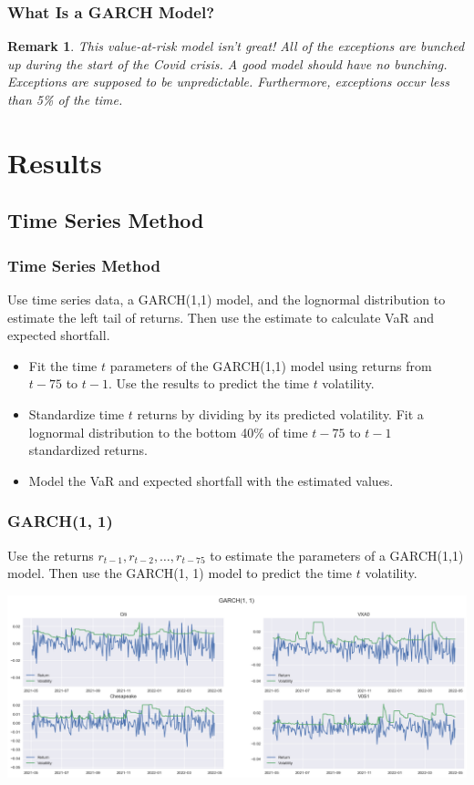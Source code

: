 \documentclass{beamer}
\newtheorem*{remark}{Remark}
\begin{document}
\begin{frame}
\frametitle{What Is a GARCH Model?}
\begin{remark}
This value-at-risk model isn't great! All of the exceptions are bunched up during the start of the Covid crisis. A good model should have no bunching. Exceptions are supposed to be unpredictable. Furthermore, exceptions occur less than 5\% of the time.
\end{remark}

\end{frame}

\section{Results}

\subsection{Time Series Method}

\begin{frame}
\frametitle{Time Series Method}

Use time series data, a GARCH(1,1) model, and the lognormal distribution to estimate the left tail of returns. Then use the estimate to calculate VaR and expected shortfall.
\begin{itemize}
\item Fit the time $t$ parameters of the GARCH(1,1) model using returns from $t-75$ to $t-1$. Use the results to predict the time $t$ volatility.
\item Standardize time $t$ returns by dividing by its predicted volatility. Fit a lognormal distribution to the bottom 40\% of time $t-75$ to $t-1$ standardized returns.
\item Model the VaR and expected shortfall with the estimated values.
\end{itemize}

\end{frame}

\begin{frame}

\frametitle{GARCH(1, 1)}
Use the returns $r_{t-1}, r_{t-2},\ldots, r_{t-75}$ to estimate the parameters of a GARCH(1,1) model. Then use the GARCH(1, 1) model to predict the time $t$ volatility.
\begin{center}
\includegraphics[scale = 0.25]{garch.png}
\end{center}

\end{frame}
\end{document}
